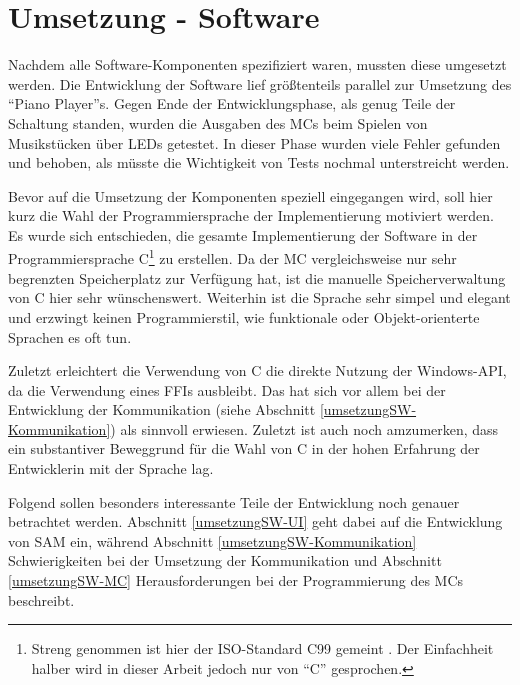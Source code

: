
\chapter{Umsetzung - Software} \label{umsetzungSW}

Nachdem alle Software-Komponenten spezifiziert waren, mussten diese umgesetzt werden.
Die Entwicklung der Software lief größtenteils parallel zur Umsetzung des \enquote{Piano Player}s.
Gegen Ende der Entwicklungsphase, als genug Teile der Schaltung standen, wurden die Ausgaben des \ac{MC}s beim Spielen von Musikstücken über LEDs getestet.
In dieser Phase wurden viele Fehler gefunden und behoben, als müsste die Wichtigkeit von Tests nochmal unterstreicht werden.

Bevor auf die Umsetzung der Komponenten speziell eingegangen wird, soll hier kurz die Wahl der Programmiersprache der Implementierung motiviert werden. \newline
Es wurde sich entschieden, die gesamte Implementierung der Software in der Programmiersprache C\footnote{Streng genommen ist hier der ISO-Standard C99 gemeint \cite*[siehe ][]{iso.c99}. Der Einfachheit halber wird in dieser Arbeit jedoch nur von \enquote{C} gesprochen.} zu erstellen.
Da der \ac{MC} vergleichsweise nur sehr begrenzten Speicherplatz zur Verfügung hat, ist die manuelle Speicherverwaltung von C hier sehr wünschenswert.
Weiterhin ist die Sprache sehr simpel und elegant und erzwingt keinen Programmierstil, wie funktionale oder Objekt-orienterte Sprachen es oft tun.

Zuletzt erleichtert die Verwendung von C die direkte Nutzung der Windows-API, da die Verwendung eines \ac{FFI}s ausbleibt.
Das hat sich vor allem bei der Entwicklung der Kommunikation (siehe Abschnitt \ref{umsetzungSW-Kommunikation}) als sinnvoll erwiesen.
Zuletzt ist auch noch amzumerken, dass ein substantiver Beweggrund für die Wahl von C in der hohen Erfahrung der Entwicklerin mit der Sprache lag.

Folgend sollen besonders interessante Teile der Entwicklung noch genauer betrachtet werden.
Abschnitt \ref{umsetzungSW-UI} geht dabei auf die Entwicklung von \ac{SAM} ein, während Abschnitt \ref{umsetzungSW-Kommunikation} Schwierigkeiten bei der Umsetzung der Kommunikation und Abschnitt \ref{umsetzungSW-MC} Herausforderungen bei der Programmierung des \ac{MC}s beschreibt.


